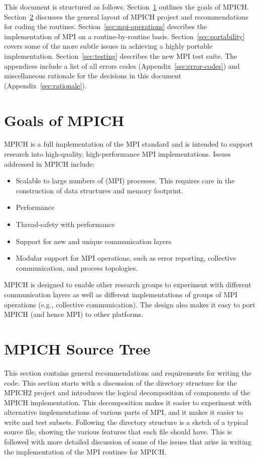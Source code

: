 \documentclass{article}
\begin{document}
This document is structured as follows.  Section~\ref{sec:goals}
outlines the goals of MPICH.  Section~\ref{sec:general} discusses
the general layout of MPICH project and recommendations for coding the
routines.  
Section~\ref{sec:mpi-operations} describes the implementation of
MPI on a routine-by-routine basis.  Section~\ref{sec:portability} covers some
of the more subtle issues in achieving a highly portable implementation.
Section~\ref{sec:testing} describes the new MPI test suite.  The appendices
include a list of all errors codes (Appendix~\ref{sec:error-codes}) and
miscellaneous rationale for the decisions in this document
(Appendix~\ref{sec:rationale}). 

\section{Goals of MPICH}
\label{sec:goals}

MPICH is a full implementation of the MPI standard and is intended to
support research into high-quality, high-performance MPI
implementations.  Issues addressed in MPICH include:
\begin{itemize}
\item Scalable to large numbers of (MPI) processes.  This requires
  care in the construction of data structures and memory footprint.
\item Performance
\item Thread-safety with performance
\item Support for new and unique communication layers
\item Modular support for MPI operations, such as error reporting,
 collective communication, and process topologies.
\end{itemize}
MPICH is designed to enable other research groups to experiment with
different communication layers as well as different implementations of
groups of MPI operations (e.g., collective communication).  The design
also makes it easy to port MPICH (and hence MPI) to other platforms.

\section{MPICH Source Tree}
\label{sec:general}

This section contains general recommendations and requirements for
writing the code.  
This section starts with a discussion of the directory structure for the
MPICH2 project and introduces the logical decomposition of components of the
MPICH implementation.  This decomposition makes it easier to experiment with
alternative implementations of various parts of MPI, and it makes it easier to
write and test subsets.
Following the directory structure is a sketch of a typical source file,
showing the various features that each file should have.  This is followed
with more detailed discussion of some of the issues that arise in writing the
implementation of the MPI routines for MPICH.
\end{document}
